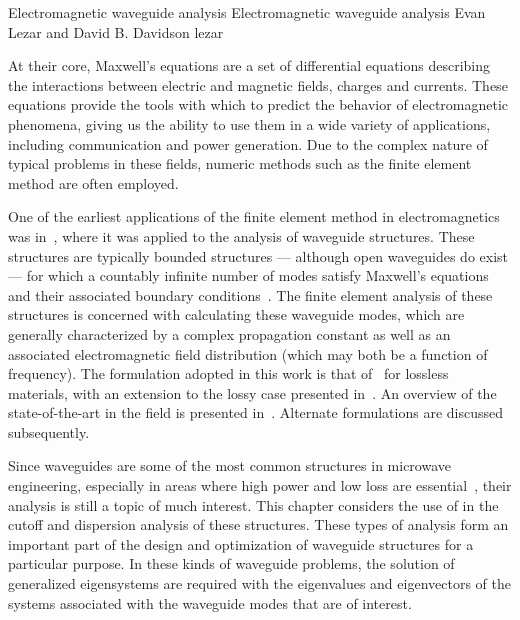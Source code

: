               {Electromagnetic waveguide analysis}
              {Electromagnetic waveguide analysis}
              {Evan Lezar and David B. Davidson}
              {lezar}


At their core, Maxwell's equations are a
set of differential equations describing the interactions between
electric and magnetic fields, charges and currents. These equations
provide the tools with which to predict the behavior of
electromagnetic phenomena, giving us the
ability to use them in a wide variety of applications, including
communication and power generation. Due to the complex nature of
typical problems in these fields, numeric methods such as the finite
element method are often employed.

One of the earliest applications of the finite element method in
electromagnetics was in~\citet{Silvester1969}, where it was applied to
the analysis of waveguide structures. These
structures are typically bounded structures --- although open
waveguides do exist --- for which a countably infinite number of modes
satisfy Maxwell's equations and their associated boundary
conditions~\citep{Pozar2005}. The finite element analysis of these
structures is concerned with calculating these waveguide modes, which
are generally characterized by a complex propagation constant as well
as an associated electromagnetic field distribution (which may both be
a function of frequency). The formulation adopted in this work is that
of~\citet{LeeSunCendes1991} for lossless materials, with an extension
to the lossy case presented in~\citet{Lee1994}. An overview of the
state-of-the-art in the field is presented
in~\citet{Davidson2011}. Alternate formulations are discussed
subsequently.

Since waveguides are some of the most common structures in microwave
engineering, especially in areas where high power and low loss are
essential~\citep{Pozar2005}, their analysis is still a topic of much
interest. This chapter considers the use of \fenics{} in the cutoff
and dispersion analysis of these structures. These types of analysis form an important part
of the design and optimization of waveguide structures for a particular
purpose. In these kinds of waveguide problems, the solution of generalized
eigensystems are required with the eigenvalues and eigenvectors of the
systems associated with the waveguide modes that are of interest.

